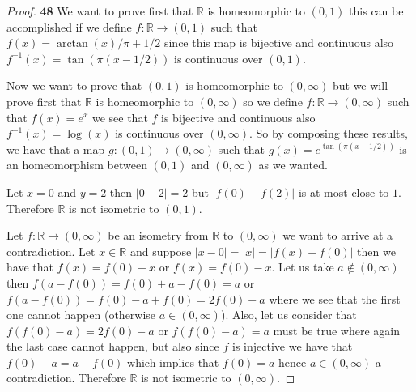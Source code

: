 \documentclass[11pt]{article}
\newcommand{\R}{\mathbb{R}}
\theoremstyle{definition}
\begin{document}
    \begin{proof}{\textbf{48}}
        We want to prove first that $\R$ is homeomorphic to $(0,1)$ this can
        be accomplished if we define $f:\R \to (0,1)$ such that
        $f(x) = \arctan(x)/\pi + 1/2$ since this map is
        bijective and continuous also $f^{-1}(x) = \tan(\pi(x - 1/2))$ is
        continuous over $(0,1)$.
        
        Now we want to prove that $(0,1)$ is homeomorphic to $(0,\infty)$ but
        we will prove first that $\R$ is homeomorphic to $(0,\infty)$ so we
        define $f:\R \to (0,\infty)$ such that $f(x)=e^{x}$ we see that $f$
        is bijective and continuous also $f^{-1}(x) = \log(x)$ is continuous
        over $(0,\infty)$. So by composing these results, we have that
        a map $g:(0,1) \to (0,\infty)$ such that
        $g(x) = e^{\tan(\pi(x - 1/2))}$ is an homeomorphism between $(0,1)$
        and $(0,\infty)$ as we wanted.

        Let $x=0$ and $y=2$ then $|0-2| = 2$ but $|f(0)-f(2)|$ is at most
        close to $1$. Therefore $\R$ is not isometric to $(0,1)$.

        Let $f:\R \to (0,\infty)$ be an isometry from $\R$ to $(0,\infty)$ we
        want to arrive at a contradiction. Let $x \in \R$ and suppose
        $|x-0| = |x| = |f(x) - f(0)|$ then we have that
        $f(x) = f(0) + x$ or $f(x) = f(0) - x$.
        Let us take $a \not\in (0,\infty)$ then
        $f(a - f(0)) = f(0) + a - f(0) = a$ or
        $f(a - f(0)) = f(0) -a + f(0) = 2f(0) - a$ where we see that the first
        one cannot happen (otherwise $a \in (0,\infty)$). Also, let us consider
        that $f(f(0) - a) = 2f(0) - a$ or $f(f(0)-a) = a$ must be true
        where again the last case cannot happen, but also since $f$ is
        injective we have that $f(0) - a = a - f(0)$  which implies that
        $f(0)= a$ hence $a \in (0, \infty)$ a contradiction.
        Therefore $\R$ is not isometric to $(0,\infty)$.
    \end{proof}
\cleardoublepage
\end{document}
